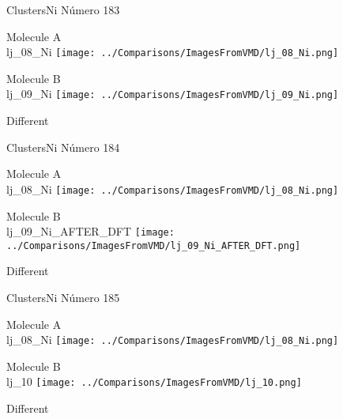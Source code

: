  \newpage

\vtab[-3cm]
\begin{center}
{\large ClustersNi \tab Número 183}
\end{center}
\begin{multicols}{2}
\begin{center}
Molecule A \\ 
lj\_08\_Ni
\texttt{[image: ../Comparisons/ImagesFromVMD/lj\_08\_Ni.png]}
\\
\vtab

\columnbreak
Molecule B \\ 
lj\_09\_Ni
\texttt{[image: ../Comparisons/ImagesFromVMD/lj\_09\_Ni.png]}
\\
\vtab


\end{center}
\end{multicols}
\begin{center}
\textcolor{NavyBlue}{\Large Different}
\end{center}

 \newpage

\vtab[-3cm]
\begin{center}
{\large ClustersNi \tab Número 184}
\end{center}
\begin{multicols}{2}
\begin{center}
Molecule A \\ 
lj\_08\_Ni
\texttt{[image: ../Comparisons/ImagesFromVMD/lj\_08\_Ni.png]}
\\
\vtab

\columnbreak
Molecule B \\ 
lj\_09\_Ni\_AFTER\_DFT
\texttt{[image: ../Comparisons/ImagesFromVMD/lj\_09\_Ni\_AFTER\_DFT.png]}
\\
\vtab


\end{center}
\end{multicols}
\begin{center}
\textcolor{NavyBlue}{\Large Different}
\end{center}

 \newpage

\vtab[-3cm]
\begin{center}
{\large ClustersNi \tab Número 185}
\end{center}
\begin{multicols}{2}
\begin{center}
Molecule A \\ 
lj\_08\_Ni
\texttt{[image: ../Comparisons/ImagesFromVMD/lj\_08\_Ni.png]}
\\
\vtab

\columnbreak
Molecule B \\ 
lj\_10
\texttt{[image: ../Comparisons/ImagesFromVMD/lj\_10.png]}
\\
\vtab


\end{center}
\end{multicols}
\begin{center}
\textcolor{NavyBlue}{\Large Different}
\end{center}

